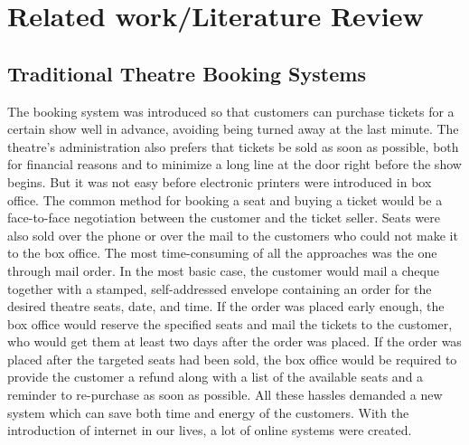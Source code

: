 \documentclass[12pt]{article}
\begin{document}
\section{Related work/Literature Review}
\clearpage

\subsection{Traditional Theatre Booking Systems}
The booking system was introduced so that customers can purchase tickets for a certain show well in advance, avoiding being turned away at the last minute. The theatre's administration also prefers that tickets be sold as soon as possible, both for financial reasons and to minimize a long line at the door right before the show begins. But it was not easy before electronic printers were introduced in box office. The common method for booking a seat and buying a ticket would be a face-to-face negotiation between the customer and the ticket seller. 
Seats were also sold over the phone or over the mail to the customers who could not make it to the box office. The most time-consuming of all the approaches was the one through mail order. In the most basic case, the customer would mail a cheque together with a stamped, self-addressed envelope containing an order for the desired theatre seats, date, and time.  If the order was placed early enough, the box office would reserve the specified seats and mail the tickets to the customer, who would get them at least two days after the order was placed. If the order was placed after the targeted seats had been sold, the box office would be required to provide the customer a refund along with a list of the available seats and a reminder to re-purchase as soon as possible. All these hassles demanded a new system which can save both time and energy of the customers. With the introduction of internet in our lives, a lot of online systems were created.
\end{document}
